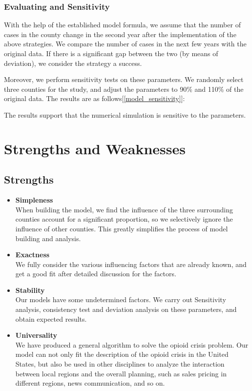 \documentclass{mcmthesis}
\begin{document}
\subsubsection{Evaluating and Sensitivity}
With the help of the established model formula, we assume that the number of cases in the county change in the second year after the implementation of the above strategies. We compare the number of cases in the next few years with the original data. If there is a significant gap between the two (by means of deviation), we consider the strategy a success.

Moreover, we perform sensitivity tests on these parameters. We randomly select three counties for the study, and adjust the parameters to 90\% and 110\% of the original data. The results are as follows[\ref{model_sensitivity}]:


The results support that the numerical simulation is sensitive to the parameters.

\section{Strengths and Weaknesses}

\subsection{Strengths}
\begin{itemize}
	\item \textbf{Simpleness}\\
	When building the model, we find the influence of the three surrounding counties account for a significant proportion, so we selectively ignore the influence of other counties. This greatly simplifies the process of model building and analysis.
	\item \textbf{Exactness}\\
	We fully consider the various influencing factors that are already known, and get a good fit after detailed discussion for the factors.
	\item \textbf{Stability}\\
	Our models have some undetermined factors. We carry out Sensitivity analysis, consistency test and deviation analysis on these parameters, and obtain expected results.
	\item \textbf{Universality}\\
	We have produced a general algorithm to solve the opioid crisis problem. Our model can not only fit the description of the opioid crisis in the United States, but also be used in other disciplines to analyze the interaction between local regions and the overall planning, such as sales pricing in different regions, news communication, and so on.
\end{itemize}
\end{document}
